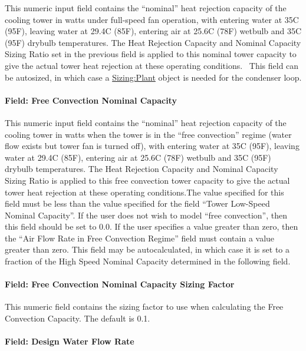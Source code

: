This numeric input field contains the ``nominal'' heat rejection capacity of the cooling tower in watts under full-speed fan operation, with entering water at 35C (95F), leaving water at 29.4C (85F), entering air at 25.6C (78F) wetbulb and 35C (95F) drybulb temperatures. The Heat Rejection Capacity and Nominal Capacity Sizing Ratio set in the previous field is applied to this nominal tower capacity to give the actual tower heat rejection at these operating conditions.~ This field can be autosized, in which case a \hyperref[sizingplant]{Sizing:Plant} object is needed for the condenser loop.

\paragraph{Field: Free Convection Nominal Capacity}\label{field-free-convection-nominal-capacity}

This numeric input field contains the ``nominal'' heat rejection capacity of the cooling tower in watts when the tower is in the ``free convection'' regime (water flow exists but tower fan is turned off), with entering water at 35C (95F), leaving water at 29.4C (85F), entering air at 25.6C (78F) wetbulb and 35C (95F) drybulb temperatures. The Heat Rejection Capacity and Nominal Capacity Sizing Ratio is applied to this free convection tower capacity to give the actual tower heat rejection at these operating conditions.The value specified for this field must be less than the value specified for the field ``Tower Low-Speed Nominal Capacity''. If the user does not wish to model ``free convection'', then this field should be set to 0.0. If the user specifies a value greater than zero, then the ``Air Flow Rate in Free Convection Regime'' field must contain a value greater than zero. This field may be autocalculated, in which case it is set to a fraction of the High Speed Nominal Capacity determined in the following field.

\paragraph{Field: Free Convection Nominal Capacity Sizing Factor}\label{field-free-convection-nominal-capacity-sizing-factor-2}

This numeric field contains the sizing factor to use when calculating the Free Convection Capacity. The default is 0.1.

\paragraph{Field: Design Water Flow Rate}\label{field-design-water-flow-rate-2}

